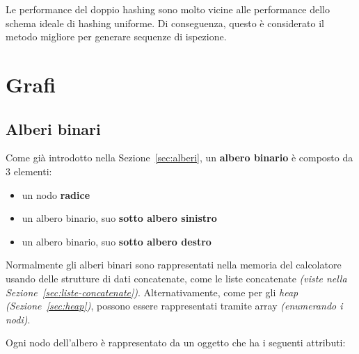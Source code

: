 \documentclass[italian, 10pt]{article}
\begin{document}
Le performance del doppio hashing sono molto vicine alle performance dello schema ideale di hashing uniforme.
Di conseguenza, questo è considerato il metodo migliore per generare sequenze di ispezione.

\clearpage

\section{Grafi}
\label{sec:grafi}

\subsection{Alberi binari}

Come già introdotto nella Sezione~\ref{sec:alberi}, un \textbf{albero binario} è composto da \(3\) elementi:

\begin{itemize}
  \item un nodo \textbf{radice}
  \item un albero binario, suo \textbf{sotto albero sinistro}
  \item un albero binario, suo \textbf{sotto albero destro}
\end{itemize}

Normalmente gli alberi binari sono rappresentati nella memoria del calcolatore usando delle strutture di dati concatenate, come le liste concatenate \textit{(viste nella Sezione~\ref{sec:liste-concatenate})}.
Alternativamente, come per gli \textit{heap} \textit{(Sezione~\ref{sec:heap})}, possono essere rappresentati tramite array \textit{(enumerando i nodi)}.

Ogni nodo dell'albero è rappresentato da un oggetto che ha i seguenti attributi:
\end{document}
